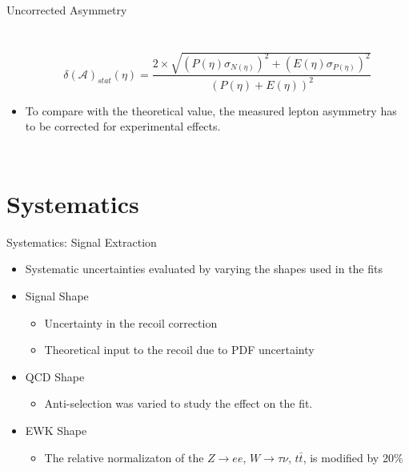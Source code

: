 \documentclass[t, 8pt]{beamer}
\begin{document}
\begin{frame}{Uncorrected Asymmetry}
\begin{columns}[c]
\begin{itemize}
  \tiny{
  \begin{equation}
    \delta(\mathcal{A})_{stat}(\eta) = 
    \frac{2 \times \sqrt{ \left( P(\eta) \sigma_{N(\eta)}\right) ^2 + \left( E(\eta) \sigma_{P (\eta)}\right)^2}}{\left(  P(\eta) +  E(\eta) \right)^{2} }
  \end{equation}
  }
  \normalsize

    \item To compare with the theoretical value, the measured lepton asymmetry
    has to be corrected for experimental effects.
  \end{itemize}
  \end{columns}
\end{frame}


\section{Systematics}

\begin{frame}{Systematics: Signal Extraction}
  \begin{itemize}
    \item Systematic uncertainties evaluated by varying the shapes used in the fits
    \item Signal Shape
    \begin{itemize}
      \item Uncertainty in the recoil correction
      \item Theoretical input to the recoil due to PDF uncertainty
    \end{itemize}
    \item QCD Shape
    \begin{itemize}
      \item Anti-selection was varied to study the effect on the fit. 
    \end{itemize}
    \item EWK Shape
    \begin{itemize}
      \item The relative normalizaton of the $Z \to ee$, $W \to \tau\nu$,
      $t\bar{t}$, is modified by $20\%$
    \end{itemize}
 \end{itemize}
\end{frame}
\end{document}
